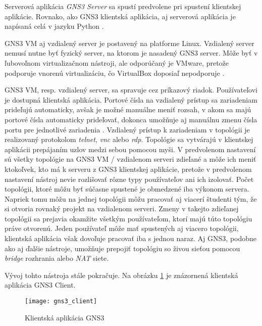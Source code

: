 Serverová aplikácia \emph{GNS3 Server} sa spustí predvolene pri spustení klientskej aplikácie. Rovnako, ako GNS3 klientská aplikácia, aj serverová aplikácia je napísaná celá v jazyku Python \cite{gns3_server_github}.

GNS3 VM aj vzdialený server je postavený na platforme Linux. Vzdialený server nemusí nutne byť fyzický server, na ktorom je nasadený GNS3 server. Môže byť v ľubovoľnom virtualizačnom nástroji, ale odporúčaný je VMware, pretože podporuje vnorenú virtualizáciu, čo VirtualBox doposiaľ nepodporuje \cite{nested_virtualization}.

GNS3 VM, resp. vzdialený server, sa spravuje cez príkazový riadok. Používateľovi je dostupná klientská aplikácia. Portové čísla na vzdialený prístup sa zariadeniam prideľujú automaticky, avšak je možné manuálne meniť rozsah, v akom sa majú portové čísla automaticky prideľovať, dokonca umožňuje aj manuálnu zmenu čísla portu pre jednotlivé zariadenia \cite{gns3_console_ports, gns3_console_ports_remote}. Vzdialený prístup k zariadeniam v topológii je realizovaný protokolom \emph{telnet}, \emph{vnc} alebo \emph{rdp}. Topológie sa vytvárajú v klientskej aplikácii prepájaním uzlov medzi sebou pomocou myši. V predvolenom nastavení sú všetky topológie na GNS3 VM / vzdialenom serveri zdieľané a môže ich meniť ktokoľvek, kto má k serveru z GNS3 klientskej aplikácie, pretože v predvolenom nastavení nástroj nevie rozlišovať rôzne typy používateľov ani ich izolovať. Počet topológii, ktoré môžu byť súčasne spustené je obmedzené iba výkonom servera. Napriek tomu môžu na jednej topológii môžu pracovať aj viacerí študenti tým, že si otvoria rovnaký projekt na vzdialenom serveri. Zmeny v takejto zdieľanej topológii sa prejavia okamžite všetkým používateľom, ktorí majú túto topológiu práve otvorenú. Jeden používateľ môže mať spustených aj viacero topológii, klientská aplikácia však dovoľuje pracovať iba s jednou naraz. Aj GNS3, podobne ako aj ďalšie nástroje, umožňuje prepojiť topológiu so živou sieťou pomocou \emph{bridge} rozhrania alebo \emph{NAT} siete.

Vývoj tohto nástroja stále pokračuje. Na obrázku \ref{obr:gns3_client} je znázornená klientská aplikácia GNS3 Client.

\setlength{\textfloatsep}{50pt}

\begin{figure}
    \centering
    \texttt{[image: gns3\_client]}
    \caption{Klientská aplikácia GNS3}
    \label{obr:gns3_client}
\end{figure}





